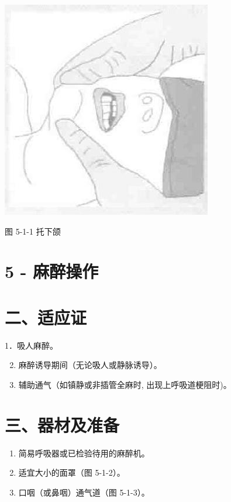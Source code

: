\documentclass[10pt]{article}
\begin{document}
\begin{center}
\includegraphics[max width=\textwidth]{2024_07_05_645bb794a4d4f32ee0c8g-282}
\end{center}

图 5-1-1 托下颌

\section*{5 - 麻醉操作}
\section*{二、适应证}
1．吸人麻醉。

\begin{enumerate}
  \setcounter{enumi}{1}
  \item 麻醉诱导期间（无论吸人或静脉诱导）。

  \item 辅助通气（如镇静或非插管全麻时, 出现上呼吸道梗阻时)。

\end{enumerate}

\section*{三、器材及准备}
\begin{enumerate}
  \item 简易呼吸器或已检验待用的麻醉机。

  \item 适宜大小的面罩（图 5-1-2）。

  \item 口咽（或鼻咽）通气道（图 5-1-3）。

\end{enumerate}
\end{document}
